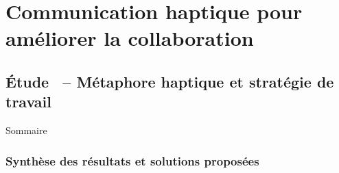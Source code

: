 \documentclass[english,french,dvips,10pt]{mybeamer}
\begin{document}
	\section{Communication haptique pour améliorer la collaboration}
	\subsection{Étude~ -- Métaphore haptique et stratégie de travail}
	\begin{myframe}{Sommaire}
		\tableofcontents[sectionstyle=show/shaded,subsectionstyle=show/shaded/hide,subsubsectionstyle=show/show/hide]
	\end{myframe}
	\subsubsection{Synthèse des résultats et solutions proposées}
\end{document}
